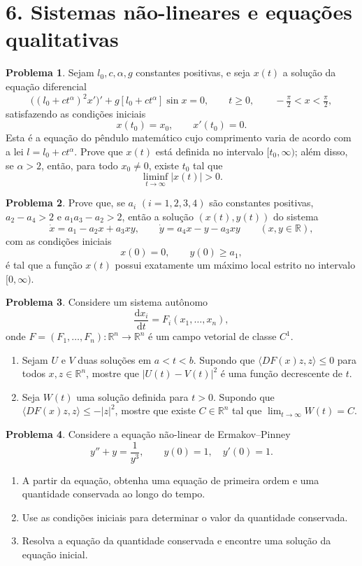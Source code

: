 \documentclass[10pt,a4paper]{amsart}
\newcommand{\R}{\mathbb{R}}
\renewcommand{\d}{\mathrm{d}}
\theoremstyle{definition}
\newtheorem{problema}{Problema}
\begin{document}
\section*{6. Sistemas não-lineares e equações qualitativas}

\begin{problema}
Sejam $l_0,c,\alpha,g$ constantes positivas, e seja $x(t)$ a solução da
equação diferencial
\[
    \bigl((l_0+ct^\alpha)^2x'\bigr)'
    +g[l_0+ct^\alpha]\sin x=0,
    \qquad t\ge 0,\qquad -\tfrac{\pi}{2}<x<\tfrac{\pi}{2},
\]
satisfazendo as condições iniciais
\[
    x(t_0)=x_0,\qquad x'(t_0)=0.
\]
Esta é a equação do pêndulo matemático cujo comprimento varia de acordo com
a lei $l=l_0+ct^\alpha$. Prove que $x(t)$ está definida no intervalo
$[t_0,\infty)$; além disso, se $\alpha>2$, então, para todo $x_0\neq 0$,
existe $t_0$ tal que
\[
    \liminf_{t\to\infty}|x(t)|>0.
\]
\end{problema}

\begin{problema}
Prove que, se $a_i$ $(i=1,2,3,4)$ são constantes positivas, $a_2-a_4>2$ e
$a_1a_3-a_2>2$, então a solução $(x(t),y(t))$ do sistema
\[
    \dot{x}=a_1-a_2x+a_3xy,
    \qquad
    \dot{y}=a_4x-y-a_3xy
    \qquad (x,y\in\R),
\]
com as condições iniciais
\[
    x(0)=0,\qquad y(0)\ge a_1,
\]
é tal que a função $x(t)$ possui exatamente um máximo local estrito no
intervalo $[0,\infty)$.
\end{problema}

\begin{problema}
Considere um sistema autônomo
\[
    \frac{\d x_i}{\d t}=F_i(x_1,\dots,x_n),
\]
onde $F=(F_1,\dots,F_n):\R^n\to\R^n$ é um campo vetorial de classe $C^1$.
\begin{enumerate}[label=(\alph*)]
    \item Sejam $U$ e $V$ duas soluções em $a<t<b$. Supondo que
    $\langle DF(x)z,z\rangle\le 0$ para todos $x,z\in\R^n$, mostre que
    $|U(t)-V(t)|^2$ é uma função decrescente de $t$.
    \item Seja $W(t)$ uma solução definida para $t>0$. Supondo que
    $\langle DF(x)z,z\rangle\le -|z|^2$, mostre que existe $C\in\R^n$ tal que
    $\lim_{t\to\infty}W(t)=C$.
\end{enumerate}
\end{problema}

\begin{problema}
Considere a equação não-linear de Ermakov--Pinney
\[
    y''+y=\frac{1}{y^3},\qquad y(0)=1,\quad y'(0)=1.
\]
\begin{enumerate}[label=(\alph*)]
    \item A partir da equação, obtenha uma equação de primeira ordem e uma
    quantidade conservada ao longo do tempo.
    \item Use as condições iniciais para determinar o valor da quantidade
    conservada.
    \item Resolva a equação da quantidade conservada e encontre uma solução
    da equação inicial.
\end{enumerate}
\end{problema}
\end{document}

